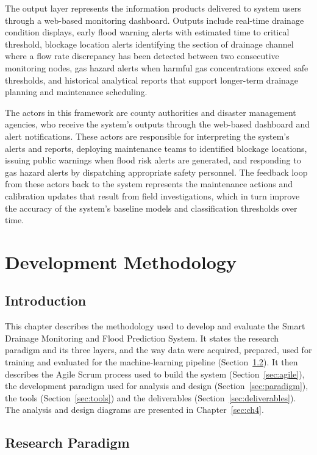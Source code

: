 \documentclass[12pt, a4paper]{article}
\begin{document}
The output layer represents the information products delivered to system users through a web-based monitoring dashboard. Outputs include real-time drainage condition displays, early flood warning alerts with estimated time to critical threshold, blockage location alerts identifying the section of drainage channel where a flow rate discrepancy has been detected between two consecutive monitoring nodes, gas hazard alerts when harmful gas concentrations exceed safe thresholds, and historical analytical reports that support longer-term drainage planning and maintenance scheduling.

The actors in this framework are county authorities and disaster management agencies, who receive the system's outputs through the web-based dashboard and alert notifications. These actors are responsible for interpreting the system's alerts and reports, deploying maintenance teams to identified blockage locations, issuing public warnings when flood risk alerts are generated, and responding to gas hazard alerts by dispatching appropriate safety personnel. The feedback loop from these actors back to the system represents the maintenance actions and calibration updates that result from field investigations, which in turn improve the accuracy of the system's baseline models and classification thresholds over time.

\clearpage
\section{Development Methodology}
\label{sec:ch3}

\subsection{Introduction}

This chapter describes the methodology used to develop and evaluate the Smart Drainage Monitoring and Flood Prediction System. It states the research paradigm and its three layers, and the way data were acquired, prepared, used for training and evaluated for the machine-learning pipeline (Section~\ref{sec:research-paradigm}). It then describes the Agile Scrum process used to build the system (Section~\ref{sec:agile}), the development paradigm used for analysis and design (Section~\ref{sec:paradigm}), the tools (Section~\ref{sec:tools}) and the deliverables (Section~\ref{sec:deliverables}). The analysis and design diagrams are presented in Chapter~\ref{sec:ch4}.

\subsection{Research Paradigm}
\label{sec:research-paradigm}
\end{document}
